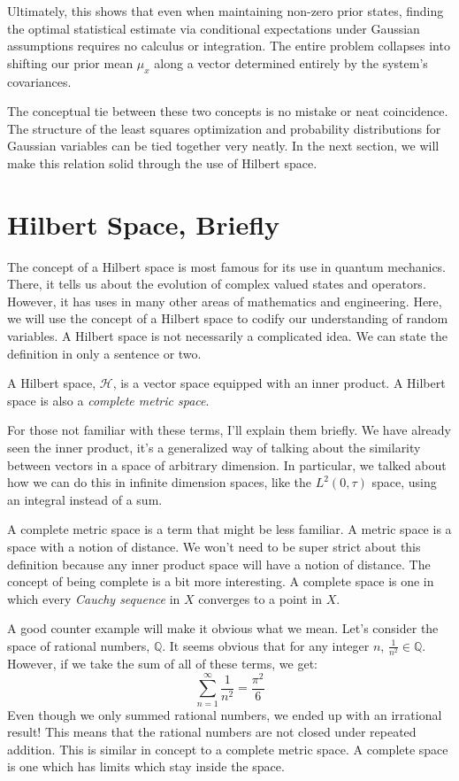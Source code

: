 Ultimately, this shows that even when maintaining non-zero prior states, finding the optimal statistical estimate via conditional expectations under Gaussian assumptions requires no calculus or integration. The entire problem collapses into shifting our prior mean $\mu_x$ along a vector determined entirely by the system's covariances.

The conceptual tie between these two concepts is no mistake or neat coincidence. The structure of the least squares optimization and probability distributions for Gaussian variables can be tied together very neatly. In the next section, we will make this relation solid through the use of Hilbert space.


\section{Hilbert Space, Briefly}\label{sec:hilbert space}

The concept of a Hilbert space is most famous for its use in quantum mechanics. There, it tells us about the evolution of complex valued states and operators. However, it has uses in many other areas of mathematics and engineering. Here, we will use the concept of a Hilbert space to codify our understanding of random variables. A Hilbert space is not necessarily a complicated idea. We can state the definition in only a sentence or two.
\begin{definition}
A Hilbert space, $\mathcal{H}$, is a vector space equipped with an inner product. A Hilbert space is also a \textit{complete metric space}.
\end{definition}

For those not familiar with these terms, I'll explain them briefly. We have already seen the inner product, it's a generalized way of talking about the similarity between vectors in a space of arbitrary dimension. In particular, we talked about how we can do this in infinite dimension spaces, like the $L^2(0,\tau)$ space, using an integral instead of a sum.

A complete metric space is a term that might be less familiar. A metric space is a space with a notion of distance. We won't need to be super strict about this definition because any inner product space will have a notion of distance. The concept of being complete is a bit more interesting. A complete space is one in which every \textit{Cauchy sequence} in $X$ converges to a point in $X$.

A good counter example will make it obvious what we mean. Let's consider the space of rational numbers, $\mathbb{Q}$. It seems obvious that for any integer $n$, $\frac{1}{n^2}\in\mathbb{Q}$. However, if we take the sum of all of these terms, we get:
$$\sum_{n=1}^\infty\frac{1}{n^2}=\frac{\pi^2}{6}$$
Even though we only summed rational numbers, we ended up with an irrational result! This means that the rational numbers are not closed under repeated addition. This is similar in concept to a complete metric space. A complete space is one which has limits which stay inside the space.


